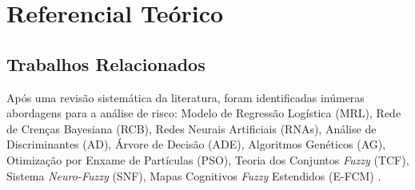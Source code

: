 \chapter{Referencial Teórico}\label{cap:background}

\section{Trabalhos Relacionados}

Após uma revisão sistemática da literatura, foram identificadas inúmeras abordagens para a análise de risco: Modelo de Regressão Logística (MRL), Rede de Crenças Bayesiana (RCB), Redes Neurais Artificiais (RNAs), Análise de Discriminantes (AD), Árvore de Decisão (ADE), Algoritmos Genéticos (AG), Otimização por Enxame de Partículas (PSO), Teoria dos Conjuntos \textit{Fuzzy} (TCF), Sistema \textit{Neuro-Fuzzy} (SNF), Mapas Cognitivos \textit{Fuzzy} Estendidos (E-FCM) \cite{mizuno2001prediction} \cite{huang2004neuro} \cite{hu2007software} \cite{attarzadeh2010novel} \cite{dzega2010classification} \cite{yu2011software} \cite{saxena2012software} \cite{dan2013improving}.

